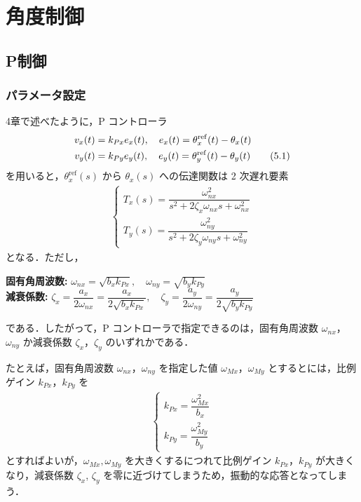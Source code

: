 \section{角度制御}
\subsection{P制御}
\subsubsection{パラメータ設定}

4章で述べたように，P コントローラ
\begin{align}
    v_x(t) &= k_{Px} e_x(t),\quad e_x(t) = \theta_x^{\mathrm{ref}}(t) - \theta_x(t) \notag \\
    v_y(t) &= k_{Py} e_y(t),\quad e_y(t) = \theta_y^{\mathrm{ref}}(t) - \theta_y(t)
    \tag{5.1}
\end{align}
を用いると，$\theta_x^{\mathrm{ref}}(s)$ から $\theta_x(s)$ への伝達関数は 2 次遅れ要素
\begin{align}
    \begin{cases}
        T_x(s) = \dfrac{\omega_{nx}^2}{s^2 + 2\zeta_x \omega_{nx} s + \omega_{nx}^2} \\
        T_y(s) = \dfrac{\omega_{ny}^2}{s^2 + 2\zeta_y \omega_{ny} s + \omega_{ny}^2}
    \end{cases}
    \tag{5.2}
\end{align}
となる．ただし，
\begin{tcolorbox}[colframe=black!75!white, colback=white!95!white, boxrule=0.5pt]
\textbf{固有角周波数:} 
$\omega_{nx} = \sqrt{b_x k_{Px}},\quad \omega_{ny} = \sqrt{b_y k_{Py}}$ \\
\textbf{減衰係数:} 
$\zeta_x = \dfrac{a_x}{2\omega_{nx}} = \dfrac{a_x}{2\sqrt{b_x k_{Px}}},\quad
\zeta_y = \dfrac{a_y}{2\omega_{ny}} = \dfrac{a_y}{2\sqrt{b_y k_{Py}}}$
\end{tcolorbox}
である．したがって，P コントローラで指定できるのは，固有角周波数 $\omega_{nx}$，$\omega_{ny}$ か減衰係数 $\zeta_x$，$\zeta_y$ のいずれかである．

たとえば，固有角周波数 $\omega_{nx}$，$\omega_{ny}$ を指定した値 $\omega_{Mx}$，$\omega_{My}$ とするとには，比例ゲイン $k_{Px}$，$k_{Py}$ を
\begin{align}
    \begin{cases}
        k_{Px} = \dfrac{\omega_{Mx}^2}{b_x} \\
        k_{Py} = \dfrac{\omega_{My}^2}{b_y}
    \end{cases}
    \tag{5.4}
\end{align}
とすればよいが，$\omega_{Mx}, \omega_{My}$ を大きくするにつれて比例ゲイン $k_{Px}$，$k_{Py}$ が大きくなり，減衰係数 $\zeta_x$, $\zeta_y$ を零に近づけてしまうため，振動的な応答となってしまう．

